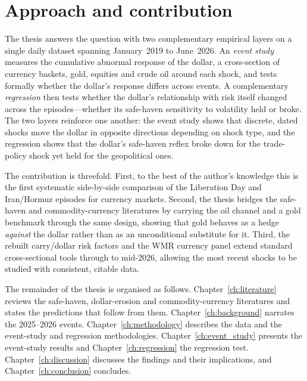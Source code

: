 \section*{Approach and contribution}

The thesis answers the question with two complementary empirical layers on a single daily
dataset spanning January~2019 to June~2026. An \emph{event study} measures the cumulative
abnormal response of the dollar, a cross-section of currency baskets, gold, equities and
crude oil around each shock, and tests formally whether the dollar's response differs across
events. A complementary \emph{regression} then tests whether the dollar's relationship with
risk itself changed across the episodes---whether its safe-haven sensitivity to volatility
held or broke. The two layers reinforce one another: the event study shows that discrete,
dated shocks move the dollar in opposite directions depending on shock type, and the
regression shows that the dollar's safe-haven reflex broke down for the trade-policy shock
yet held for the geopolitical ones.

The contribution is threefold. First, to the best of the author's knowledge this is the
first systematic side-by-side comparison of the Liberation Day and Iran/Hormuz episodes for
currency markets. Second, the thesis bridges the safe-haven and commodity-currency
literatures by carrying the oil channel and a gold benchmark through the same design,
showing that gold behaves as a hedge \emph{against} the dollar rather than as an
unconditional substitute for it. Third, the rebuilt carry/dollar risk factors and the WMR
currency panel extend standard cross-sectional tools through to mid-2026, allowing the most
recent shocks to be studied with consistent, citable data.

The remainder of the thesis is organised as follows. Chapter~\ref{ch:literature} reviews the
safe-haven, dollar-erosion and commodity-currency literatures and states the predictions
that follow from them. Chapter~\ref{ch:background} narrates the 2025--2026 events.
Chapter~\ref{ch:methodology} describes the data and the event-study and regression
methodologies. Chapter~\ref{ch:event_study} presents the event-study results and
Chapter~\ref{ch:regression} the regression test. Chapter~\ref{ch:discussion} discusses the
findings and their implications,
and Chapter~\ref{ch:conclusion} concludes.
